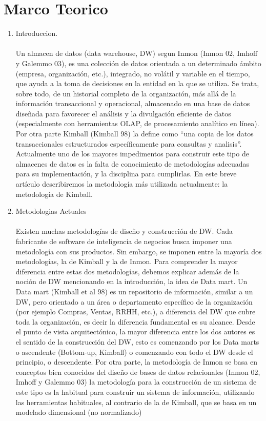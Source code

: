 \documentclass[preprint,12pt]{elsarticle}
\begin{document}
	

\section{Marco Teorico}

\begin{enumerate}[3.1]
    \item Introduccion. \\
\\
Un almacen de datos (data warehouse, DW) segun Inmon (Inmon 02, Imhoff y Galemmo 03), es una colecci\'on de datos orientada a un determinado \'ambito (empresa, organización, etc.), integrado, no volátil y variable en el tiempo, que ayuda a la toma de decisiones en la entidad en la que se utiliza. Se trata, sobre todo, de un historial completo de la organización, más allá de la información transaccional y operacional, almacenado en una base de datos diseñada para favorecer el análisis y la divulgación eficiente de datos (especialmente con herramientas OLAP, de procesamiento analítico en línea). Por otra parte Kimball (Kimball 98) la define como “una copia de los datos transaccionales estructurados específicamente para consultas y analisis”. Actualmente uno de los mayores impedimentos para construir este tipo de almacenes de datos es la falta de conocimiento de metodologías adecuadas para su implementación, y la disciplina para cumplirlas. En este breve art\'iculo describiremos la metodología más utilizada actualmente: la metodología de Kimball.

    \item Metodologias Actuales \\
\\
 Existen muchas metodologías de diseño y construcción de DW. Cada fabricante de software de inteligencia de negocios busca imponer una metodología con sus productos. Sin embargo, se imponen entre la mayoría dos metodologías, la de Kimball y la de Inmon. Para comprender la mayor diferencia entre estas dos metodologías, debemos explicar además de la noción de DW mencionando en la introducción, la idea de Data mart. Un Data mart (Kimball et al 98) es un repositorio de información, similar a un DW, pero orientado a un área o departamento específico de la  organización (por ejemplo Compras, Ventas, RRHH, etc.), a diferencia del DW que cubre toda la organización, es decir la diferencia fundamental es su alcance.
Desde el punto de vista arquitectónico, la mayor diferencia entre los dos autores es el sentido de la construcción del DW, esto es comenzando por los Data marts o ascendente (Bottom-up, Kimball) o comenzando con todo el DW desde el principio, o descendente.
Por otra parte, la metodología de Inmon se basa en conceptos bien conocidos del diseño de bases de datos relacionales (Inmon 02, Imhoff y Galemmo 03) la metodología para la construcción de un sistema de este tipo es la habitual para construir un sistema de información, utilizando las herramientas habituales, al contrario de la de Kimball, que se basa en un modelado dimensional (no normalizado)



\end{enumerate}
\end{document}
